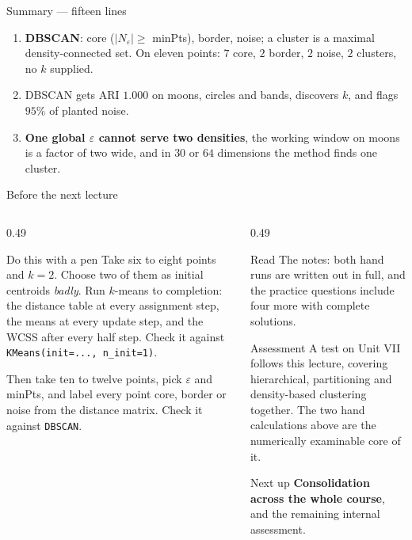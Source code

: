 \documentclass[aspectratio=169]{beamer}
\begin{document}
\begin{frame}[shrink=17]{Summary --- fifteen lines}
\begin{enumerate}
      $n=4000$ for $4.4\%$ more cost. Randomised --- $5.3\%$ over ten seeds.
    \item \textbf{DBSCAN}: core ($|N_\varepsilon| \ge$ minPts), border,
      noise; a cluster is a maximal density-connected set. On eleven points:
      $7$ core, $2$ border, $2$ noise, $2$ clusters, no $k$ supplied.
    \item DBSCAN gets ARI $1.000$ on moons, circles and bands, discovers $k$,
      and flags $95\%$ of planted noise.
    \item \textbf{One global $\varepsilon$ cannot serve two densities},
      the working window on moons is a factor of two wide, and in $30$ or
      $64$ dimensions the method finds one cluster.
  \end{enumerate}
\end{frame}

\begin{frame}[shrink=14]{Before the next lecture}
  \begin{columns}[T]
    \begin{column}{0.49\textwidth}
      \begin{block}{Do this with a pen}
        Take six to eight points and $k = 2$. Choose two of them as initial
        centroids \emph{badly}. Run $k$-means to completion: the distance
        table at every assignment step, the means at every update step, and
        the WCSS after every half step. Check it against
        \texttt{KMeans(init=...,\ n\_init=1)}.

        \medskip
        Then take ten to twelve points, pick $\varepsilon$ and minPts, and
        label every point core, border or noise from the distance matrix.
        Check it against \texttt{DBSCAN}.
      \end{block}
    \end{column}
    \begin{column}{0.49\textwidth}
      \begin{block}{Read}
        The notes: both hand runs are written out in full, and the practice
        questions include four more with complete solutions.
      \end{block}
      \begin{alertblock}{Assessment}
        A test on Unit VII follows this lecture, covering hierarchical,
        partitioning and density-based clustering together. The two hand
        calculations above are the numerically examinable core of it.
      \end{alertblock}
      \begin{exampleblock}{Next up}
        \textbf{Consolidation across the whole course}, and the remaining
        internal assessment.
      \end{exampleblock}
    \end{column}
  \end{columns}
  \slidesources{\AMLUnitVIISources}
\end{frame}
\end{document}
